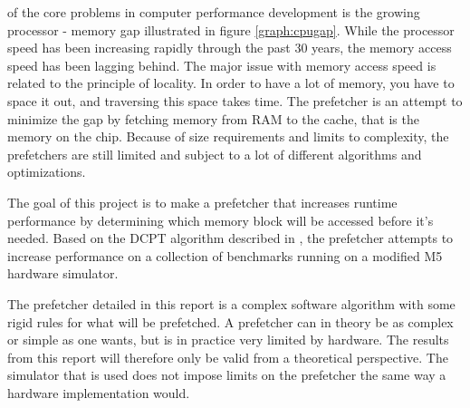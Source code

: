  of the core problems in computer performance development is the growing processor - memory gap illustrated in figure \ref{graph:cpugap}. While the processor speed has been increasing rapidly through the past 30 years, the memory access speed has been lagging behind. The major issue with memory access speed is related to the principle of locality. In order to have a lot of memory, you have to space it out, and traversing this space takes time. The prefetcher is an attempt to minimize the gap by fetching memory from RAM to the cache, that is the memory on the chip. Because of size requirements and limits to complexity, the prefetchers are still limited and subject to a lot of different algorithms and optimizations.

The goal of this project is to make a prefetcher that increases runtime performance by determining which memory block will be accessed before it's needed. Based on the DCPT algorithm described in \cite{reference:jahre}, the prefetcher attempts to increase performance on a collection of benchmarks running on a modified M5 hardware simulator. 

The prefetcher detailed in this report is a complex software algorithm with some rigid rules for what will be prefetched. A prefetcher can in theory be as complex or simple as one wants, but is in practice very limited by hardware. The results from this report will therefore only be valid from a theoretical perspective. The simulator that is used does not impose limits on the prefetcher the same way a hardware implementation would.
